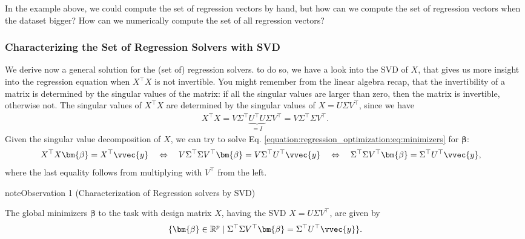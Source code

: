 \documentclass[letterpaper,10pt,english]{jupyterBook}
\begin{document}
\sphinxAtStartPar
In the example above, we could compute the set of regression vectors by hand, but how can we compute the set of regression vectors when the dataset bigger? How can we numerically compute the set of all regression vectors?


\subsubsection{Characterizing the Set of Regression Solvers with SVD}
\label{\detokenize{regression_optimization:characterizing-the-set-of-regression-solvers-with-svd}}
\sphinxAtStartPar
We derive now a general solution for the (set of) regression solvers.
to do so, we have a look into the SVD of \(X\), that gives us more insight into the regression equation when \(X^\top X\) is not invertible. You might remember from the linear algebra recap, that the invertibility of a matrix is determined by the singular values of the matrix: if all the singular values are larger than zero, then the matrix is invertible, otherwise not. The singular values of \(X^\top X\) are determined by the singular values of \(X=U\Sigma V^\top\), since we have
\begin{align*}
    X^\top X = V\Sigma^\top \underbrace{U^\top U}_{=I} \Sigma V^\top = V\Sigma^\top \Sigma V^\top.
\end{align*}
\sphinxAtStartPar
Given the singular value decomposition of \(X\), we can try to solve Eq. \eqref{equation:regression_optimization:eq:minimizers} for \(\bm\beta\):
\label{equation:regression_optimization:edb21818-5876-464b-9adc-4c7e531abd5a}\begin{align}
   X^\top X\bm{\beta} &= X^\top \vvec{y} \quad 
   \Leftrightarrow \quad V\Sigma^\top\Sigma V^\top \bm{\beta}= V\Sigma^\top U^\top\vvec{y}
   \quad 
   \Leftrightarrow \quad \Sigma^\top\Sigma V^\top \bm{\beta}= \Sigma^\top U^\top\vvec{y}, \label{eq:beta1}
\end{align}
\sphinxAtStartPar
where the last equality follows from multiplying with \(V^\top\) from the left.
\label{regression_optimization:observation-2}
\begin{sphinxadmonition}{note}{Observation 1 (Characterization of Regression solvers by SVD)}



\sphinxAtStartPar
The global minimizers \(\bm{\beta}\) to the {\hyperref[\detokenize{regression_optimization:regr-task}]{}} task with design matrix \(X\), having the SVD \(X=U\Sigma V^\top\), are given by
\begin{equation*}
\begin{split}\{\bm{\beta}\in\mathbb{R}^p\mid \Sigma^\top\Sigma V^\top \bm{\beta}= \Sigma^\top U^\top\vvec{y} \}.\end{split}
\end{equation*}
\end{sphinxadmonition}
\end{document}
